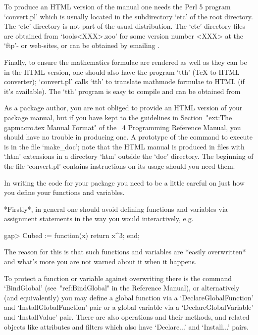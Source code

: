 To produce an HTML version of the manual one needs  the  Perl  5  program
`convert.pl' which is usually located in the subdirectory  `etc'  of  the
{\GAP} root directory. The `etc' directory  is  not  part  of  the  usual
{\GAP}  distribution.  The  `etc'  directory  files  are  obtained   from
`tools<XXX>.zoo' for some version number <XXX> at the  {\GAP}  `ftp'-  or
web-sites,      or      can      be      obtained       by       emailing
.

Finally, to ensure the mathematics formulae are rendered as well as  they
can be in the HTML version,  one  should  also  have  the  program  `tth'
({\TeX}  to  HTML  converter);  `convert.pl'  calls  `tth'  to  translate
mathmode formulae to HTML (if it's available). The `tth' program is  easy
to compile and can be obtained from

As a package author, you are not obliged to provide an  HTML  version  of
your  package  manual,  but  if  you  have  kept  to  the  guidelines  in
Section~"ext:The gapmacro.tex Manual Format" of the {\GAP}~4  Programming
Reference Manual,  you  should  have  no  trouble  in  producing  one.  A
prototype of the command to execute is in the file `make_doc'; note  that
the HTML manual  is  produced  in  files  with  `.htm'  extensions  in  a
directory `htm' outside the `doc' directory. The beginning  of  the  file
`convert.pl' contains instructions on its usage should you need them.


In writing the {\GAP} code for your package  you  need  to  be  a  little
careful on just how you define your functions and variables.

*Firstly*, in general one should avoid defining functions  and  variables
via assignment statements in the way you would interactively, e.g.

\beginexample
gap> Cubed := function(x) return x^3; end;
\endexample

The reason for this is that such  functions  and  variables  are  *easily
overwritten* and what's more you are not warned about it when it happens.

To protect a function  or  variable  against  overwriting  there  is  the
command  `BindGlobal'  (see~"ref:BindGlobal"  in  the  {\GAP}   Reference
Manual), or alternatively (and equivalently)  you  may  define  a  global
function via a `DeclareGlobalFunction' and  `InstallGlobalFunction'  pair
or a global variable via  a  `DeclareGlobalVariable'  and  `InstallValue'
pair. There are also operations and their methods,  and  related  objects
like attributes and filters which also have `Declare...' and `Install...'
pairs.

